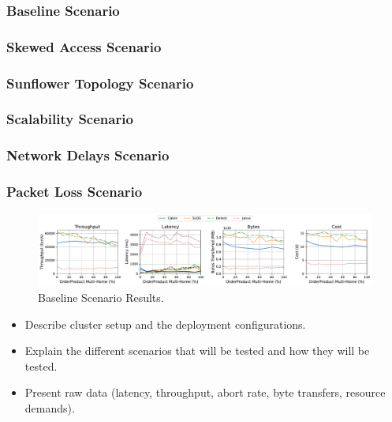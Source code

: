 \subsubsection{Baseline Scenario}
\subsubsection{Skewed Access Scenario}
\subsubsection{Sunflower Topology Scenario}
\subsubsection{Scalability Scenario}
\subsubsection{Network Delays Scenario}
\subsubsection{Packet Loss Scenario}

\begin{figure}[ht]
    \centering
    \includegraphics[width=1\textwidth]{figures/Baseline.pdf}
    \caption{Baseline Scenario Results.}
    \label{fig: baseline-scenario}
\end{figure}

\begin{itemize}
    \item Describe cluster setup and the deployment configurations.
    \item Explain the different scenarios that will be tested and how they will be tested.
    \item Present raw data (latency, throughput, abort rate, byte transfers, resource demands).
\end{itemize}